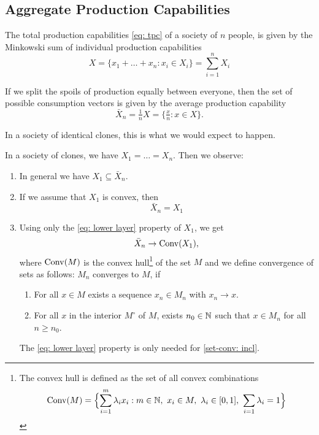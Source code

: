 \subsection{Aggregate Production Capabilities}

The total production capabilities \eqref{eq: tpc} of a society of \(n\) people, is given by the
Minkowski sum of individual production capabilities
\begin{equation}
	\label{eq: tpc}\tag{TPC}
	X = \{ x_1 + \dots + x_n : x_i \in X_i\} = \sum_{i=1}^n X_i
\end{equation}

If we split the spoils of production equally between everyone, then the set of
possible consumption vectors is given by the average production capability
\begin{equation}
	\label{eq: apc}\tag{APC}
	\bar{X}_n = \tfrac1n X = \{\tfrac{x}n : x\in X\}.
\end{equation}

In a society of identical clones, this is what we would expect to happen.

\begin{lemma}
	\label{lem: clone prod cap}
	In a society of clones, we have \(X_1=\dots = X_n\). Then we observe:
	\begin{enumerate}
		\item In general we have \(X_1\subseteq \bar{X}_n\).
		\item If we assume that \(X_1\) is convex, then
		\[
			\bar{X}_n = X_1
		\]
		\item Using only the \ref{eq: lower layer} property of \(X_1\), we get
		\[
			\bar{X}_n \to \operatorname{Conv}(X_1),
		\]
		where \(\operatorname{Conv}(M)\) is the convex hull\footnote{
			The convex hull is defined as the set of all convex combinations
			\[
				\conv(M)= \Bigl\{\sum_{i=1}^m \lambda_i x_i : m\in\nat,\ x_i \in M,\ \lambda_i\in[0,1],\ \sum_{i=1}\lambda_i =1\Bigr\}
			\]
		} of the set \(M\) and we define
		convergence of sets as follows: \(M_n\) converges to \(M\), if

		\begin{enumerate}
			\item\label{set-conv: seq} For all \(x\in M\) exists a sequence
			\(x_n\in M_n\) with \(x_n\to x\).

			\item\label{set-conv: incl} For all \(x\) in the interior \(M^\circ\)
			of \(M\), exists \(n_0\in\mathbb{N}\) such that \(x\in M_n\) for all \(n\ge
			n_0\).
		\end{enumerate}
		The \ref{eq: lower layer} property is only needed for \ref{set-conv:
		incl}.
	\end{enumerate}
\end{lemma}


